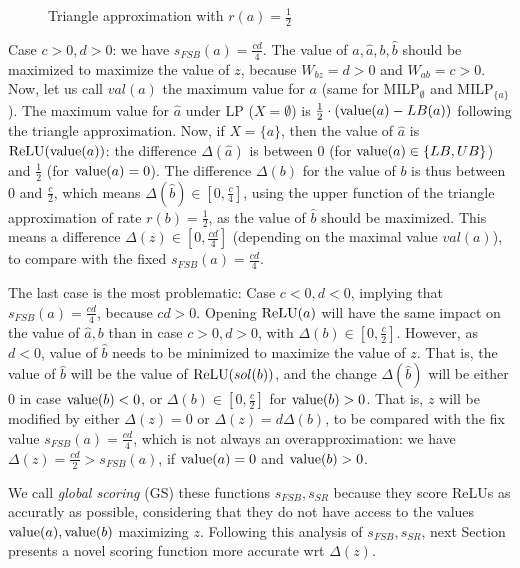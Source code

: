 {\begin{figure}[t!]
\begin{centering}
		\caption{Triangle approximation with $r(a)=\frac{1}{2}$
		\vspace{-0.3cm}}
	\label{triangle}
	\end{centering}
	\end{figure}





Case $c>0,d>0$: we have $s_{FSB}(a)=\frac{cd}{4}$.
The value of $a,\hat{a},b,\hat{b}$ should be maximized to maximize the value of $z$, because $W_{bz}=d>0$ and $W_{ab}=c>0$. 
Now, let us call $val(a)$ the maximum value for $a$ 
(same for MILP$_\emptyset$ and MILP$_{\{a\}}$).
The maximum value for $\hat{a}$ under LP ($X=\emptyset$) is 
$\frac{1}{2} \cdot ({\textrm{value}}(a)-LB(a))$ following the triangle approximation. 
Now, if $X=\{a\}$, then the value of $\hat{a}$ is $\mathrm{ReLU}({\textrm{value}}(a))$: the difference 
$\Delta(\hat{a})$ is between 0 (for ${\textrm{value}}(a)\in \{LB,UB\}$) and $\frac{1}{2}$ (for ${\textrm{value}}(a)=0$). The difference $\Delta(b)$ for the value of $b$ is thus between 0 and $\frac{c}{2}$, which means $\Delta(\hat{b}) \in [0, \frac{c}{4}]$, using the upper function of the triangle approximation of rate $r(b)=\frac{1}{2}$, as the value of $\hat{b}$ should be maximized.
This means a difference $\Delta(z) \in [0, \frac{cd}{4}]$ 
(depending on the maximal value $val(a)$), to compare with the fixed 
$s_{FSB}(a)=\frac{cd}{4}$.

The last case is the most problematic: 
Case $c<0,d<0$, implying that $s_{FSB}(a)=\frac{cd}{4}$, because $cd >0$.
Opening $\mathrm{ReLU}(a)$ will have the same impact on the value of $\hat{a},b$ 
than in case $c>0,d>0$, with $\Delta(b) \in [0,\frac{c}{2}]$.
However, as $d<0$, value of $\hat{b}$ needs to be minimized to maximize the value of $z$. That is, the value of $\hat{b}$ will be the value of $\mathrm{ReLU}(sol(b))$, and the change 
$\Delta(\hat{b})$ will be either 0 in case ${\textrm{value}}(b)<0$,
or $\Delta(b) \in [0,\frac{c}{2}]$ for ${\textrm{value}}(b)>0$.
That is, $z$ will be modified by either $\Delta(z)=0$ or $\Delta(z) = d \Delta(b)$, to be compared with the fix value $s_{FSB}(a)=\frac{cd}{4}$, which is not always an overapproximation: we have $\Delta(z)=\frac{cd}{2} > s_{FSB}(a)$, 
if ${\textrm{value}}(a)=0$ and ${\textrm{value}}(b)>0$.

We call {\em global scoring} (GS) these functions $s_{FSB},s_{SR}$  because they score ReLUs as accuratly as possible, considering that they do not have access to the values 
${\textrm{value}}(a),{\textrm{value}}(b)$ maximizing $z$. Following this analysis of $s_{FSB},s_{SR}$, 
next Section presents a novel scoring function more accurate wrt $\Delta(z)$.
	
	}

